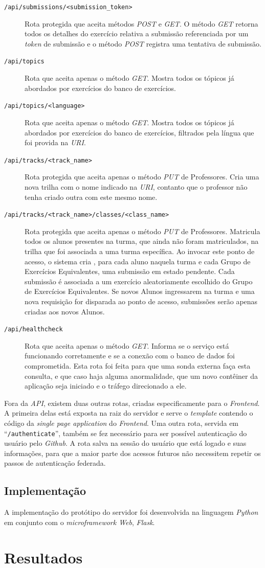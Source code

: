 \begin{description}
\item[\texttt{/api/submissions/<submission\_token>}] Rota protegida que aceita  métodos \emph{POST} e \emph{GET}. O método \emph{GET} retorna todos os detalhes do exercício relativa a submissão referenciada 
por um \emph{token} de submissão e o método \emph{POST} registra uma tentativa de submissão.
\item[\texttt{/api/topics}] Rota que aceita apenas o método \emph{GET}. Mostra todos os tópicos já abordados por exercícios do banco de exercícios.
\item[\texttt{/api/topics/<language>}] Rota que aceita apenas o método \emph{GET}. Mostra todos os tópicos já abordados por exercícios do banco de exercícios, filtrados pela língua que foi 
provida na \emph{URI}.
\item[\texttt{/api/tracks/<track\_name>}] Rota protegida que aceita apenas o método \emph{PUT} de Professores. 
Cria uma nova trilha com o nome indicado na \emph{URI}, contanto que o professor não tenha criado outra com este mesmo nome.
\item[\texttt{/api/tracks/<track\_name>/classes/<class\_name>}] Rota protegida que aceita apenas o método \emph{PUT} de Professores. Matricula todos os alunos 
presentes na turma, que ainda não foram matriculados, na trilha que foi associada a uma turma específica. Ao invocar este ponto de acesso, o sistema cria 
, para cada aluno naquela turma e cada Grupo de Exercícios Equivalentes, uma submissão em estado pendente. Cada submissão é associada a um exercício aleatoriamente 
escolhido do Grupo de Exercícios Equivalentes. Se novos Alunos ingressarem na turma e uma nova requisição for disparada  ao ponto de acesso, submissões serão apenas 
criadas aos novos Alunos.
\item[\texttt{/api/healthcheck}] Rota que aceita apenas o método \emph{GET}. Informa se o serviço está funcionando corretamente e se a conexão com o banco de dados foi comprometida. Esta rota foi feita para que uma sonda externa faça esta consulta, e que caso haja alguma anormalidade, que um novo contêiner da aplicação seja iniciado e o tráfego direcionado a ele. 
\end{description}

Fora da \emph{API}, existem duas outras rotas, criadas especificamente para o \emph{Frontend}.
A primeira delas está exposta na raiz do servidor e serve o \emph{template} contendo o código da  \emph{single page application} do \emph{Frontend}. Uma outra rota, servida em ``\texttt{/authenticate}'', também se fez necessário para ser possível autenticação do usuário pelo \emph{Github}. A rota salva na sessão do usuário que está logado e suas informações, para que a maior parte dos acessos futuros não necessitem repetir os passos de autenticação federada.

\subsection{Implementação} %
A implementação do protótipo do servidor foi desenvolvida na linguagem \emph{Python} em conjunto 
com o \emph{microframework Web}, \emph{Flask}. 

\section{Resultados}

